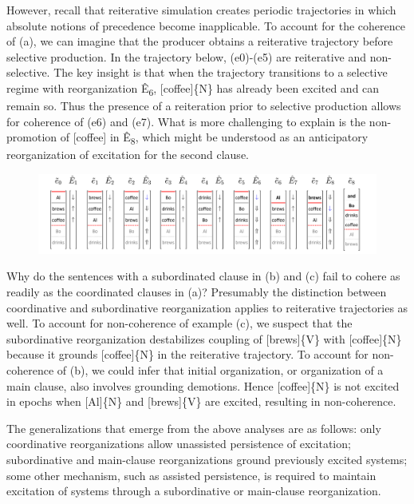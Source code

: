   However, recall that reiterative simulation creates periodic trajectories in which absolute notions of precedence become inapplicable. To account for the coherence of (a), we can imagine that the producer obtains a reiterative trajectory before selective production. In the trajectory below, (e0)-(e5) are reiterative and non-selective. The key insight is that when the trajectory transitions to a selective regime with reorganization Ê\textsubscript{6}, [coffee]\{N\} has already been excited and can remain so. Thus the presence of a reiteration prior to selective production allows for coherence of (e6) and (e7). What is more challenging to explain is the non-promotion of [coffee] in Ê\textsubscript{8}, which might be understood as an anticipatory reorganization of excitation for the second clause.

  
\begin{figure}
\includegraphics[width=\textwidth]{figures/Tilsen-img150.png}
\caption{\missingcaption}
\label{fig:}
\end{figure}
 

  Why do the sentences with a subordinated clause in (b) and (c) fail to cohere as readily as the coordinated clauses in (a)? Presumably the distinction between coordinative and subordinative reorganization applies to reiterative trajectories as well. To account for non-coherence of example (c), we suspect that the subordinative reorganization destabilizes coupling of [brews]\{V\} with [coffee]\{N\} because it grounds [coffee]\{N\} in the reiterative trajectory. To account for non-coherence of (b), we could infer that initial organization, or organization of a main clause, also involves grounding demotions. Hence [coffee]\{N\} is not excited in epochs when [Al]\{N\} and [brews]\{V\} are excited, resulting in non-coherence. 

  The generalizations that emerge from the above analyses are as follows: only coordinative reorganizations allow unassisted persistence of excitation; subordinative and main-clause reorganizations ground previously excited systems; some other mechanism, such as assisted persistence, is required to maintain excitation of systems through a subordinative or main-clause reorganization. 

